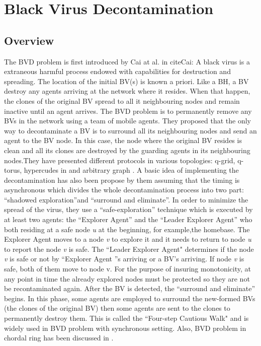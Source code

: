 \section{Black Virus Decontamination}
\subsection{Overview}
The BVD problem is first introduced by Cai at al. in cite{Cai}: A black virus is a  extraneous harmful process endowed with capabilities for destruction and spreading. The location of the initial BV(s) is known a priori. Like a BH, a BV destroy any agents arriving at the network where it resides. When that happen, the clones of the original BV spread to all it neighbouring nodes and remain inactive until an agent arrives. The BVD problem is to permanently remove any BVs in the network using a team of mobile agents. They proposed that the only way to decontaminate a BV is to surround all its neighbouring nodes and send an agent to the BV node. In this case, the node where the original BV resides is clean and all its clones are destroyed by the guarding agents in its neighbouring nodes.They have presented different protocols in various topologies: q-grid, q-torus, hypercudes in \cite{Cai} and arbitrary graph \cite{Cai1}. A basic idea of implementing the decontamination has also been propose by them assuming that the timing is asynchronous which divides the whole decontamination process into two part: ``shadowed exploration''and ``surround and eliminate''. In order to minimize the spread of the virus, they use a ``safe-exploration'' technique which is executed by at least two agents: the ``Explorer Agent'' and the ``Leader Explorer Agent'' who both residing at a safe node {\em u} at the beginning, for example,the homebase. The Explorer Agent moves to a node {\em v} to explore it and it needs to return to node {\em u} to report the node {\em v} is safe. The ``Leader Explorer Agent" determines if the node {\em v} is safe or not by ``Explorer Agent ''s arriving or a BV's arriving. If node {\em v} is safe, both of them move to node v. For the purpose of insuring monotonicity, at any point in time the already explored nodes must be protected so they are not be recontaminated again. After the BV is detected, the ``surround and eliminate'' begins. In this phase, some agents are employed to surround the new-formed BVs (the clones of the original BV) then some agents are sent to the clones to permanently destroy them. This is called the ``Four-step Cautious Walk" and is widely used in BVD problem with synchronous setting. Also, BVD problem in chordal ring has been discussed in
\cite{Alotaibi}.


